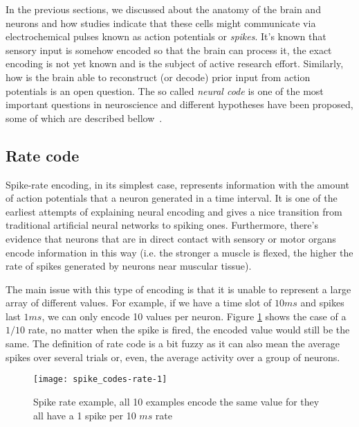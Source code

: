 In the previous sections, we discussed about the anatomy of the brain and neurons and how studies indicate that these cells might communicate via electrochemical pulses known as action potentials or \emph{spikes}. It's known that sensory input is somehow encoded so that the brain can process it, the exact encoding is not yet known and is the subject of active research effort. Similarly, how is the brain able to reconstruct (or decode) prior input from action potentials is an open question. The so called \emph{neural code} is one of the most important questions in neuroscience and different hypotheses have been proposed, some of which are described bellow~\cite{dayan2001theoretical,gollisch2009throwing}.

\subsection{Rate code}
Spike-rate encoding, in its simplest case, represents information with the amount of action potentials that a neuron generated in a time interval. It is one of the earliest attempts of explaining neural encoding and gives a nice transition from traditional artificial neural networks to spiking ones. Furthermore, there's evidence that neurons that are in direct contact with sensory or motor organs encode information in this way (i.e. the stronger a muscle is flexed, the higher the rate of spikes generated by neurons near muscular tissue).

The main issue with this type of encoding is that it is unable to represent  a large array of different values. For example, if we have a time slot of $10 ms$ and spikes last $1 ms$, we can only encode 10 values per neuron. Figure \ref{fig:neuro:spike-rate-encoding-cap} shows the case of a $1/10$ rate, no matter when the spike is fired, the encoded value would still be the same. The definition of rate code is a bit fuzzy as it can also mean the average spikes over several trials or, even, the average activity over a group of neurons.

\begin{figure}[hbt]
  \begin{center}
    \texttt{[image: spike\_codes-rate-1]}
    \caption{Spike rate example, all 10 examples encode the same value for they all have a 1 spike per 10 $ms$ rate}
    \label{fig:neuro:spike-rate-encoding-cap}
  \end{center}
\end{figure}

